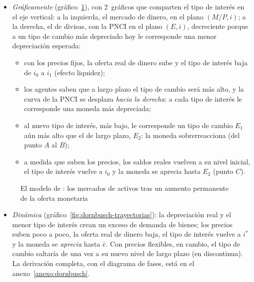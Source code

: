 \documentclass[11pt]{article}
\begin{document}
\begin{itemize}
\item \emph{Gráficamente} (gráfico~\ref{fig:dornbusch-mercados}), con 2~gráficos que comparten el tipo de interés en el eje vertical: a la izquierda, el mercado de dinero, en el plano $(M/P,i)$; a la derecha, el de divisas, con la PNCI en el plano $(E,i)$, decreciente porque a un tipo de cambio más depreciado hoy le corresponde una menor depreciación esperada:
  \begin{itemize}
  \item con los precios fijos, la oferta real de dinero sube y el tipo de interés baja de $i_0$ a $i_1$ (efecto liquidez);
  \item los agentes saben que a largo plazo el tipo de cambio será más alto, y la curva de la PNCI se desplaza \emph{hacia la derecha}: a cada tipo de interés le corresponde una moneda más depreciada;
  \item al nuevo tipo de interés, más bajo, le corresponde un tipo de cambio $E_1$ aún más alto que el de largo plazo, $E_2$: la moneda sobrerreacciona (del punto $A$ al $B$);
  \item a medida que suben los precios, los saldos reales vuelven a su nivel inicial, el tipo de interés vuelve a $i_0$ y la moneda se aprecia hasta $E_2$ (punto $C$).
  \end{itemize}
\end{itemize}

\begin{figure}[H]
\centering
\caption{El modelo de : los mercados de activos tras un aumento permanente de la oferta monetaria}\label{fig:dornbusch-mercados}
\end{figure}

\begin{itemize}
\item \emph{Dinámica} (gráfico~\ref{fig:dornbusch-trayectorias}): la depreciación real y el menor tipo de interés crean un exceso de demanda de bienes; los precios suben poco a poco, la oferta real de dinero baja, el tipo de interés vuelve a $i^*$ y la moneda se \emph{aprecia} hasta $\bar e$. Con precios flexibles, en cambio, el tipo de cambio saltaría de una vez a su nuevo nivel de largo plazo (en discontinua). La derivación completa, con el diagrama de fases, está en el anexo~\ref{anexo:dornbusch}.
\end{itemize}
\end{document}
